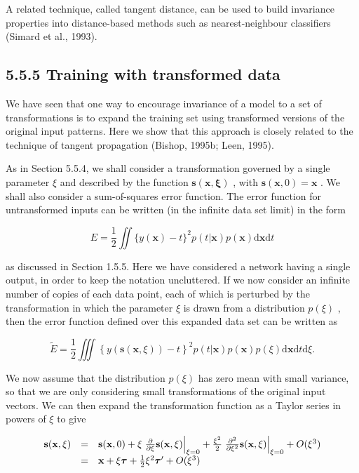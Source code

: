\documentclass[
  10
]{article}
\begin{document}
A related technique, called tangent distance, can be used to build
invariance properties into distance-based methods such as
nearest-neighbour classifiers (Simard et al., 1993).

\subsection{5.5.5 Training with transformed
data}\label{training-with-transformed-data}

We have seen that one way to encourage invariance of a model to a set of
transformations is to expand the training set using transformed versions
of the original input patterns. Here we show that this approach is
closely related to the technique of tangent propagation (Bishop, 1995b;
Leen, 1995).

As in Section 5.5.4, we shall consider a transformation governed by a
single parameter \(\xi\) and described by the function
\(\mathbf { s } ( \mathbf { x } , \boldsymbol { \xi } )\) , with
\(\mathbf { s } ( \mathbf { x } , 0 ) = \mathbf { x }\) . We shall also
consider a sum-of-squares error function. The error function for
untransformed inputs can be written (in the infinite data set limit) in
the form

\[
E = \frac {1}{2} \iint \{y (\mathbf {x}) - t \} ^ {2} p (t | \mathbf {x}) p (\mathbf {x}) \mathrm{d} \mathbf {x} \mathrm{d} t\tag{5.129}
\]

as discussed in Section 1.5.5. Here we have considered a network having
a single output, in order to keep the notation uncluttered. If we now
consider an infinite number of copies of each data point, each of which
is perturbed by the transformation in which the parameter \(\xi\) is
drawn from a distribution \(p ( \xi )\) , then the error function
defined over this expanded data set can be written as

\[
\widetilde {E} = \frac {1}{2} \iiint \left\{y (\mathbf {s} (\mathbf {x}, \xi)) - t \right\} ^ {2} p (t | \mathbf {x}) p (\mathbf {x}) p (\xi) \mathrm{d} \mathbf {x} \mathrm{d} t \mathrm{d} \xi .\tag{5.130}
\]

We now assume that the distribution \(p ( \xi )\) has zero mean with
small variance, so that we are only considering small transformations of
the original input vectors. We can then expand the transformation
function as a Taylor series in powers of \(\xi\) to give

\[
\begin{array}{r c l} \mathbf {s} (\mathbf {x}, \xi) & = & \mathbf {s} (\mathbf {x}, 0) + \xi \left. \frac {\partial}{\partial \xi} \mathbf {s} (\mathbf {x}, \xi) \right| _ {\xi = 0} + \frac {\xi^ {2}}{2} \left. \frac {\partial^ {2}}{\partial \xi^ {2}} \mathbf {s} (\mathbf {x}, \xi) \right| _ {\xi = 0} + O (\xi^ {3}) \\ & = & \mathbf {x} + \xi \boldsymbol {\tau} + \frac {1}{2} \xi^ {2} \boldsymbol {\tau} ^ {\prime} + O (\xi^ {3}) \end{array}
\]
\end{document}
